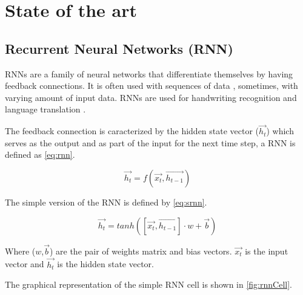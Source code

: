 \section{State of the art}\label{sec:state}

\subsection{Recurrent Neural Networks (RNN)}

RNNs are a family of neural networks that differentiate themselves by having feedback connections. It is often used with sequences of data \cite{rnn}, sometimes, with varying amount of input data. RNNs are used for handwriting recognition and language translation \cite{gru}.

The feedback connection is caracterized by the hidden state vector ($\overrightarrow{h_t}$) which serves as the output and as part of the input for the next time step, a RNN is defined as \cref{eq:rnn}.

\begin{equation}\label{eq:rnn}
  \overrightarrow{h_t}=f(\overrightarrow{x_t},\overrightarrow{h_{t-1}})
\end{equation}

The simple version of the RNN is defined by \cref{eq:srnn}.

\begin{equation}\label{eq:srnn}
  \overrightarrow{h_t}=tanh([\overrightarrow{x_t},\overrightarrow{h_{t-1}}]\cdot w + \overrightarrow{b})
\end{equation}

Where ($w$,$\overrightarrow{b}$) are the pair of weights matrix and bias vectors. $\overrightarrow{x_t}$ is the input vector and $\overrightarrow{h_t}$ is the hidden state vector.

The graphical representation of the simple RNN cell is shown in \cref{fig:rnnCell}.

\begin{figure}[t]
  \centering
  \begin{minipage}{\columnwidth}
  \end{minipage}
  \begin{minipage}{\columnwidth}
  \end{minipage}
  \caption{}
\end{figure}

